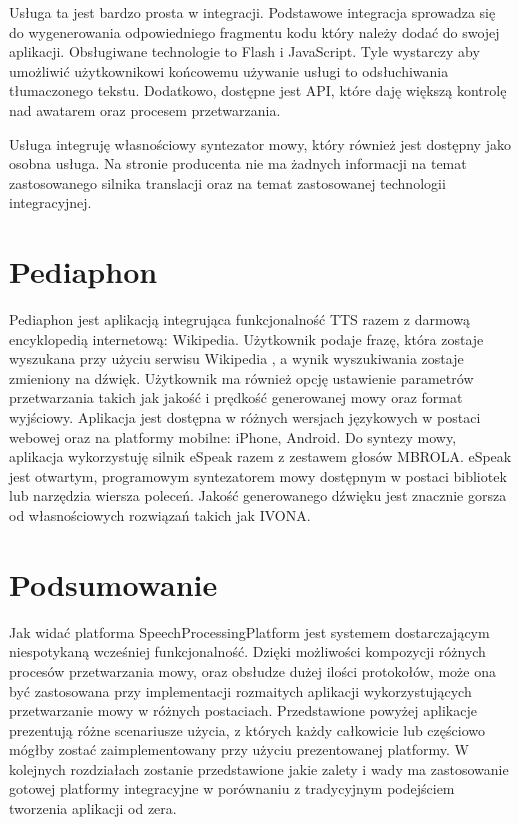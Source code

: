 Usługa ta jest bardzo prosta w integracji. Podstawowe integracja sprowadza się do wygenerowania odpowiedniego fragmentu kodu który należy dodać do swojej aplikacji. Obsługiwane technologie to Flash i JavaScript. Tyle wystarczy aby umożliwić użytkownikowi końcowemu używanie usługi to odsłuchiwania tłumaczonego tekstu. Dodatkowo, dostępne jest API, które daję większą kontrolę nad awatarem oraz procesem przetwarzania. 

Usługa integruję własnościowy syntezator mowy, który również jest dostępny jako osobna usługa. Na stronie producenta nie ma żadnych informacji na temat zastosowanego silnika translacji oraz na temat zastosowanej technologii integracyjnej.

\section {Pediaphon} 

Pediaphon\cite{pediaphon} jest aplikacją integrująca funkcjonalność TTS razem z darmową encyklopedią internetową: Wikipedia. Użytkownik podaje frazę, która zostaje wyszukana przy użyciu serwisu Wikipedia , a wynik wyszukiwania zostaje zmieniony na dźwięk. Użytkownik ma również opcję ustawienie parametrów przetwarzania takich jak jakość i prędkość generowanej mowy oraz format wyjściowy. Aplikacja jest dostępna w różnych wersjach językowych w postaci webowej oraz na platformy mobilne: iPhone, Android. Do syntezy mowy, aplikacja wykorzystuję silnik eSpeak razem z zestawem głosów MBROLA. eSpeak jest otwartym, programowym syntezatorem mowy dostępnym w postaci bibliotek lub narzędzia wiersza poleceń. Jakość generowanego dźwięku jest znacznie gorsza od własnościowych rozwiązań takich jak IVONA.

\section*{Podsumowanie} 
Jak widać platforma SpeechProcessingPlatform jest systemem dostarczającym niespotykaną wcześniej funkcjonalność. Dzięki możliwości kompozycji różnych procesów przetwarzania mowy, oraz obsłudze dużej ilości protokołów, może ona być zastosowana przy implementacji rozmaitych aplikacji wykorzystujących przetwarzanie mowy w różnych postaciach. Przedstawione powyżej aplikacje prezentują różne scenariusze użycia, z których każdy całkowicie lub częściowo mógłby zostać zaimplementowany przy użyciu prezentowanej platformy. W kolejnych rozdziałach zostanie przedstawione jakie zalety i wady ma zastosowanie gotowej platformy integracyjne w porównaniu z tradycyjnym podejściem tworzenia aplikacji od zera.





